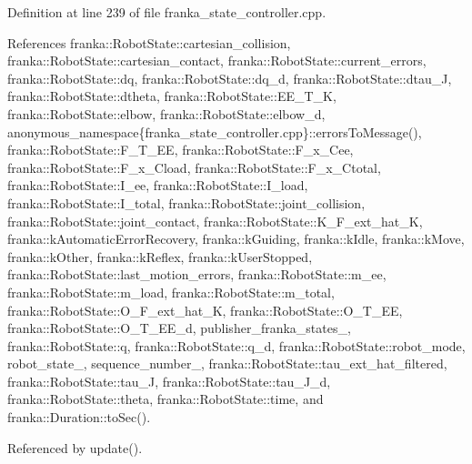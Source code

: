 Definition at line 239 of file franka\+\_\+state\+\_\+controller.\+cpp.



References franka\+::\+Robot\+State\+::cartesian\+\_\+collision, franka\+::\+Robot\+State\+::cartesian\+\_\+contact, franka\+::\+Robot\+State\+::current\+\_\+errors, franka\+::\+Robot\+State\+::dq, franka\+::\+Robot\+State\+::dq\+\_\+d, franka\+::\+Robot\+State\+::dtau\+\_\+J, franka\+::\+Robot\+State\+::dtheta, franka\+::\+Robot\+State\+::\+E\+E\+\_\+\+T\+\_\+K, franka\+::\+Robot\+State\+::elbow, franka\+::\+Robot\+State\+::elbow\+\_\+d, anonymous\+\_\+namespace\{franka\+\_\+state\+\_\+controller.\+cpp\}\+::errors\+To\+Message(), franka\+::\+Robot\+State\+::\+F\+\_\+\+T\+\_\+\+EE, franka\+::\+Robot\+State\+::\+F\+\_\+x\+\_\+\+Cee, franka\+::\+Robot\+State\+::\+F\+\_\+x\+\_\+\+Cload, franka\+::\+Robot\+State\+::\+F\+\_\+x\+\_\+\+Ctotal, franka\+::\+Robot\+State\+::\+I\+\_\+ee, franka\+::\+Robot\+State\+::\+I\+\_\+load, franka\+::\+Robot\+State\+::\+I\+\_\+total, franka\+::\+Robot\+State\+::joint\+\_\+collision, franka\+::\+Robot\+State\+::joint\+\_\+contact, franka\+::\+Robot\+State\+::\+K\+\_\+\+F\+\_\+ext\+\_\+hat\+\_\+K, franka\+::k\+Automatic\+Error\+Recovery, franka\+::k\+Guiding, franka\+::k\+Idle, franka\+::k\+Move, franka\+::k\+Other, franka\+::k\+Reflex, franka\+::k\+User\+Stopped, franka\+::\+Robot\+State\+::last\+\_\+motion\+\_\+errors, franka\+::\+Robot\+State\+::m\+\_\+ee, franka\+::\+Robot\+State\+::m\+\_\+load, franka\+::\+Robot\+State\+::m\+\_\+total, franka\+::\+Robot\+State\+::\+O\+\_\+\+F\+\_\+ext\+\_\+hat\+\_\+K, franka\+::\+Robot\+State\+::\+O\+\_\+\+T\+\_\+\+EE, franka\+::\+Robot\+State\+::\+O\+\_\+\+T\+\_\+\+E\+E\+\_\+d, publisher\+\_\+franka\+\_\+states\+\_\+, franka\+::\+Robot\+State\+::q, franka\+::\+Robot\+State\+::q\+\_\+d, franka\+::\+Robot\+State\+::robot\+\_\+mode, robot\+\_\+state\+\_\+, sequence\+\_\+number\+\_\+, franka\+::\+Robot\+State\+::tau\+\_\+ext\+\_\+hat\+\_\+filtered, franka\+::\+Robot\+State\+::tau\+\_\+J, franka\+::\+Robot\+State\+::tau\+\_\+\+J\+\_\+d, franka\+::\+Robot\+State\+::theta, franka\+::\+Robot\+State\+::time, and franka\+::\+Duration\+::to\+Sec().



Referenced by update().


